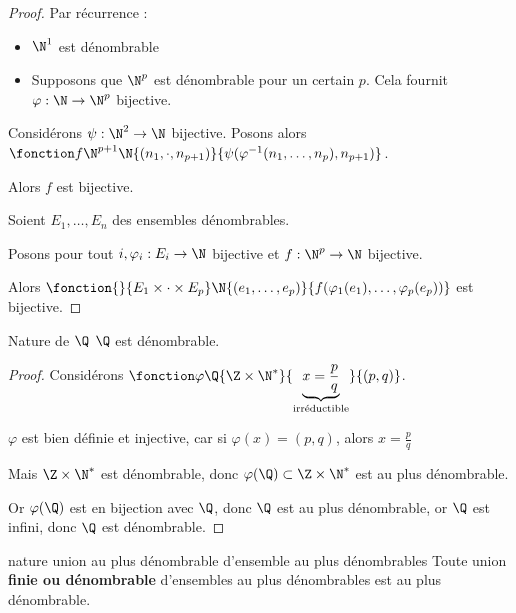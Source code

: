 \begin{proof}
    Par récurrence : 
    \begin{itemize}
        \item $\N^1$ est dénombrable 
        \item Supposons que $\N^p$ est dénombrable pour un certain $p$. Cela fournit $\varphi : \N \to \N^p$ bijective. 
    \end{itemize}

    Considérons $\psi : \N^2 \to \N$ bijective. Posons alors $\fonction f {\N^{p + 1}} \N {(n_1, \cdot, n_{p + 1})} {\psi(\varphi^{-1}(n_1, \ldots, n_p), n_{p + 1})}$.

    Alors $f$ est bijective. 

    \lvspace Soient $E_1, \ldots, E_n$ des ensembles dénombrables.

    Posons pour tout $i, \varphi_i : E_i \to \N$ bijective et $f : \N^p \to \N$ bijective.

    Alors $\fonction{}{E_1 \times \cdot \times E_p} \N {(e_1, \ldots, e_p)} {f(\varphi_1(e_1), \ldots, \varphi_p(e_p))}$ est bijective.
\end{proof}


\begin{theoreme}{Nature de $\Q$}{}
    $\Q$ est dénombrable. 
\end{theoreme}


\begin{proof}
    Considérons $\fonction \varphi \Q {\Z \times \N^*}{\underbrace{ x = \frac p q}_{\text{irréductible}} } {(p, q)}$.

    $\varphi$ est bien définie et injective, car si $\varphi(x) = (p, q)$, alors $x = \frac p q$

    Mais $\Z \times \N^*$ est dénombrable, donc $\varphi(\Q) \subset \Z \times \N^*$ est 
    au plus dénombrable. 

    Or $\varphi(\Q)$ est en bijection avec $\Q$, donc $\Q$ est au plus dénombrable, or $\Q$ est 
    infini, donc $\Q$ est dénombrable.
\end{proof}

\begin{theorement}{nature union au plus dénombrable d'ensemble au plus dénombrables}{}
    Toute union \textbf{finie ou dénombrable} d'ensembles au plus dénombrables est au plus dénombrable. 
\end{theorement}

